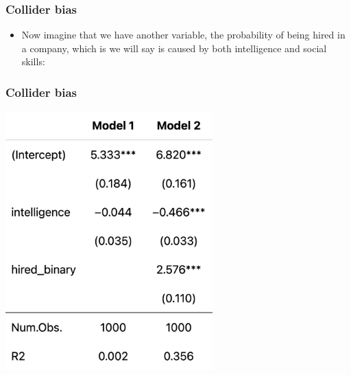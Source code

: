\documentclass[aspectratio=43]{beamer}
\begin{document}
\begin{frame}
\frametitle{Collider bias}
\centering

\begin{itemize}
  \item Now imagine that we have another variable, the probability of being hired in a company, which is we will say is caused by both intelligence and social skills:
\end{itemize}



\end{frame}

\begin{frame}
\frametitle{Collider bias}
\centering

\includegraphics[width = 0.6\textwidth]{../img/collider_m2}


\end{frame}
\end{document}
